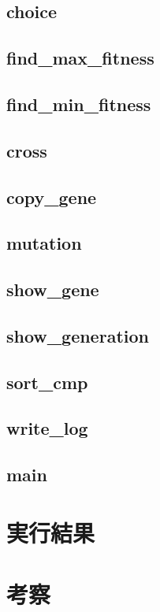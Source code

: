 \documentclass{jsarticle}
\begin{document}
\subsection{choice}
\subsection{find\_max\_fitness}
\subsection{find\_min\_fitness}
\subsection{cross}
\subsection{copy\_gene}
\subsection{mutation}
\subsection{show\_gene}
\subsection{show\_generation}
\subsection{sort\_cmp}
\subsection{write\_log}
\subsection{main}
\section{実行結果}
\section{考察}
\end{document}
